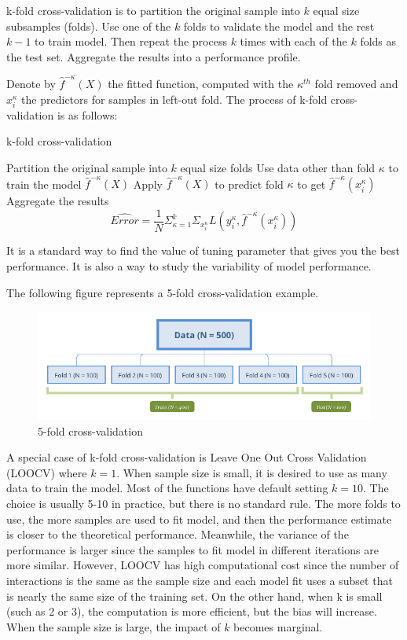 \documentclass[12pt,]{krantz}
\begin{document}
k-fold cross-validation is to partition the original sample into \(k\) equal size subsamples (folds). Use one of the \(k\) folds to validate the model and the rest \(k-1\) to train model. Then repeat the process \(k\) times with each of the \(k\) folds as the test set. Aggregate the results into a performance profile.

Denote by \(\hat{f}^{-\kappa}(X)\) the fitted function, computed with the \(\kappa^{th}\) fold removed and \(x_i^\kappa\) the predictors for samples in left-out fold. The process of k-fold cross-validation is as follows:

\begin{algorithm}
\caption{k-fold cross-validation}\label{kfoldcv} 
\begin{algorithmic}[1] 
\State Partition the original sample into $k$ equal size folds
      \State Use data other than fold $\kappa$ to train the model $\hat{f}^{-\kappa}(X)$
      \State Apply $\hat{f}^{-\kappa}(X)$ to predict fold $\kappa$ to get $\hat{f}^{-\kappa}(x_i^\kappa)$
\EndFor
\State Aggregate the results 
$$\hat{Error} = \frac{1}{N}\Sigma_{\kappa=1}^k\Sigma_{x_i^{\kappa}}L(y_i^{\kappa},\hat{f}^{-\kappa}(x_i^\kappa))$$
\end{algorithmic}
\end{algorithm}

It is a standard way to find the value of tuning parameter that gives you the best performance. It is also a way to study the variability of model performance.

The following figure represents a 5-fold cross-validation example.

\begin{figure}
\centering
\includegraphics{images/cv5fold.png}
\caption{5-fold cross-validation}
\end{figure}

A special case of k-fold cross-validation is Leave One Out Cross Validation (LOOCV) where \(k=1\). When sample size is small, it is desired to use as many data to train the model. Most of the functions have default setting \(k=10\). The choice is usually 5-10 in practice, but there is no standard rule. The more folds to use, the more samples are used to fit model, and then the performance estimate is closer to the theoretical performance. Meanwhile, the variance of the performance is larger since the samples to fit model in different iterations are more similar. However, LOOCV has high computational cost since the number of interactions is the same as the sample size and each model fit uses a subset that is nearly the same size of the training set. On the other hand, when k is small (such as 2 or 3), the computation is more efficient, but the bias will increase. When the sample size is large, the impact of \(k\) becomes marginal.
\end{document}
